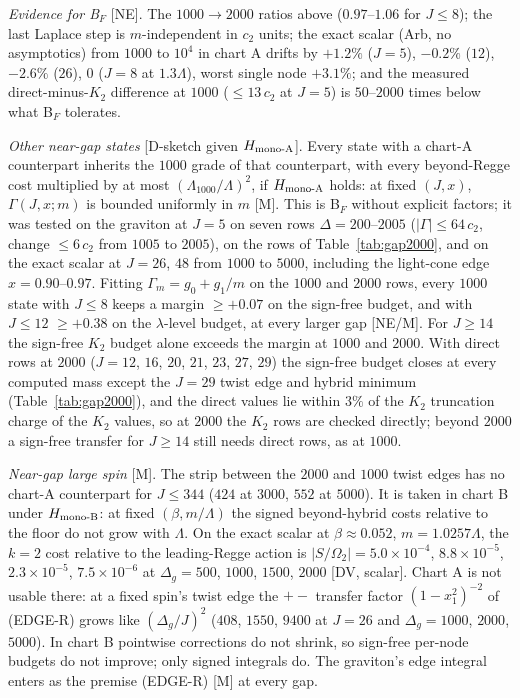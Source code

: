 \documentclass[aps,prl,onecolumn,superscriptaddress,nofootinbib]{revtex4-2}
\begin{document}
\emph{Evidence for B$_F$} [NE]. The $1000\to2000$ ratios above ($0.97$--$1.06$ for $J\le8$); the last Laplace step is
$m$-independent in $c_2$ units; the exact scalar (Arb, no asymptotics) from $1000$ to $10^4$ in chart A drifts by $+1.2\%$ ($J=5$),
$-0.2\%$ ($12$), $-2.6\%$ ($26$), $0$ ($J=8$ at $1.3\Lambda$), worst single node $+3.1\%$; and the measured direct-minus-$K_2$
difference at $1000$ ($\le13\,c_2$ at $J=5$) is $50$--$2000$ times below what B$_F$ tolerates.

\emph{Other near-gap states} [D-sketch given $H_{\rm mono\text{-}A}$]. Every state with a chart-A counterpart inherits the $1000$
grade of that counterpart, with every beyond-Regge cost multiplied by at most $(\Lambda_{1000}/\Lambda)^2$, if $H_{\rm mono\text{-}A}$
holds: at fixed $(J,x)$, $\Gamma(J,x;m)$ is bounded uniformly in $m$ [M]. This is B$_F$ without explicit factors; it was tested on the
graviton at $J=5$ on seven rows $\Delta=200$--$2005$ ($|\Gamma|\le64\,c_2$, change $\le6\,c_2$ from $1005$ to $2005$), on the rows of
Table~\ref{tab:gap2000}, and on the exact scalar at $J=26$, $48$ from $1000$ to $5000$, including the light-cone edge $x=0.90$--$0.97$.
Fitting $\Gamma_m=g_0+g_1/m$ on the $1000$ and $2000$ rows, every $1000$ state with $J\le8$ keeps a margin $\ge+0.07$ on the sign-free
budget, and with $J\le12$ $\ge+0.38$ on the $\lambda$-level budget, at every larger gap [NE/M]. For $J\ge14$ the sign-free $K_2$ budget alone exceeds the margin at $1000$ and $2000$. With direct rows at $2000$ ($J=12$, $16$, $20$,
$21$, $23$, $27$, $29$) the sign-free budget closes at every computed mass except the $J=29$ twist edge and hybrid minimum
(Table~\ref{tab:gap2000}), and the direct values lie within $3\%$ of the $K_2$ truncation charge of the $K_2$ values, so at $2000$ the
$K_2$ rows are checked directly; beyond $2000$ a sign-free transfer for $J\ge14$ still needs direct rows, as at $1000$.

\emph{Near-gap large spin} [M]. The strip between the $2000$ and $1000$ twist edges has no chart-A counterpart for $J\le344$
($424$ at $3000$, $552$ at $5000$). It is taken in chart B under $H_{\rm mono\text{-}B}$: at fixed $(\beta,m/\Lambda)$ the signed
beyond-hybrid costs relative to the floor do not grow with $\Lambda$. On the exact scalar at $\beta\approx0.052$, $m=1.0257\Lambda$, the
$k=2$ cost relative to the leading-Regge action is $|S/\Omega_2|=5.0\times10^{-4}$, $8.8\times10^{-5}$, $2.3\times10^{-5}$,
$7.5\times10^{-6}$ at $\Delta_g=500$, $1000$, $1500$, $2000$ [DV, scalar]. Chart A is not usable there: at a fixed spin's twist edge the
$+-$ transfer factor $(1-x_1^2)^{-2}$ of (EDGE-R) grows like $(\Delta_g/J)^2$ ($408$, $1550$, $9400$ at $J=26$ and $\Delta_g=1000$,
$2000$, $5000$). In chart B pointwise corrections do not shrink, so sign-free per-node budgets do not improve; only signed integrals do.
The graviton's edge integral enters as the premise (EDGE-R) [M] at every gap.
\end{document}
